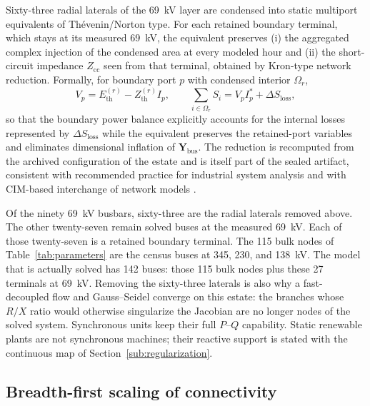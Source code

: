 Sixty-three radial laterals of the 69~kV layer are condensed into static multiport equivalents of Th\'evenin/Norton type. For each retained boundary terminal, which stays at its measured 69~kV, the equivalent preserves (i) the aggregated complex injection of the condensed area at every modeled hour and (ii) the short-circuit impedance $Z_{\mathrm{cc}}$ seen from that terminal, obtained by Kron-type network reduction. Formally, for boundary port $p$ with condensed interior $\Omega_r$,
\begin{equation}
V_p = E_{\mathrm{th}}^{(r)} - Z_{\mathrm{th}}^{(r)} I_p, \qquad \sum_{i \in \Omega_r} S_i = V_p I_p^{*} + \Delta S_{\mathrm{loss}},
\label{eq:thevenin}
\end{equation}
so that the boundary power balance explicitly accounts for the internal losses represented by $\Delta S_{\mathrm{loss}}$ while the equivalent preserves the retained-port variables and eliminates dimensional inflation of $\mathbf{Y}_{\mathrm{bus}}$. The reduction is recomputed from the archived configuration of the estate and is itself part of the sealed artifact, consistent with recommended practice for industrial system analysis \cite{ieee399} and with CIM-based interchange of network models \cite{iec61970}.

Of the ninety 69~kV busbars, sixty-three are the radial laterals removed above. The other twenty-seven remain solved buses at the measured 69~kV. Each of those twenty-seven is a retained boundary terminal. The 115 bulk nodes of Table~\ref{tab:parameters} are the census buses at 345, 230, and 138~kV. The model that is actually solved has 142 buses: those 115 bulk nodes plus these 27 terminals at 69~kV. Removing the sixty-three laterals is also why a fast-decoupled flow and Gauss--Seidel converge on this estate: the branches whose $R/X$ ratio would otherwise singularize the Jacobian are no longer nodes of the solved system. Synchronous units keep their full $P$--$Q$ capability. Static renewable plants are not synchronous machines; their reactive support is stated with the continuous map of Section~\ref{sub:regularization}.


\subsection{Breadth-first scaling of connectivity}
\label{sub:bfs}

